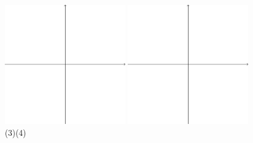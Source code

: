 \documentclass{oblivoir}
\begin{document}
\begin{center}
\includegraphics[width=0.4\textwidth]{xyaxes}\quad
\includegraphics[width=0.4\textwidth]{xyaxes}\\
(3)\qquad\qquad\qquad\qquad\qquad\qquad\quad(4)
\end{center}
\end{document}
